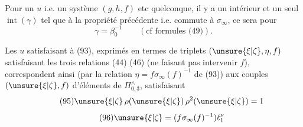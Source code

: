 Pour un $u$  \unsure{(}i.e. un système $(g,h,f)$ etc quelconque, il y a un  intérieur et un seul $\operatorname{int}(\gamma)$ tel que   à la propriété précédente i.e. commute à $\sigma_\infty$,  ce sera pour
\[
 \gamma=\beta_0^{-1}\qquad(\text{cf formules (49)}).
\]

Les $u$ satisfaisant à (93), exprimés en termes de triplets $(\unsure{\xi|\zeta},\eta,f)$ satisfaisant les trois relations (44) (46) (ne faisant pas intervenir $f$),  correspondent ainsi (par la relation $\eta=f\sigma_\infty(f)^{-1}$ de (93)) aux  couples $(\unsure{\xi|\zeta},f)$ d'éléments de $\Pi_{0,3}^{\wedge}$, satisfaisant
\[
\tag{95}
 \unsure{\xi|\zeta}\,\rho(\unsure{\xi|\zeta})\,\rho^2(\unsure{\xi|\zeta})=1
\]
\[
\tag{96}
 \unsure{\xi|\zeta}=(f\sigma_\infty(f)^{-1})\ell_1^\nu
\]

